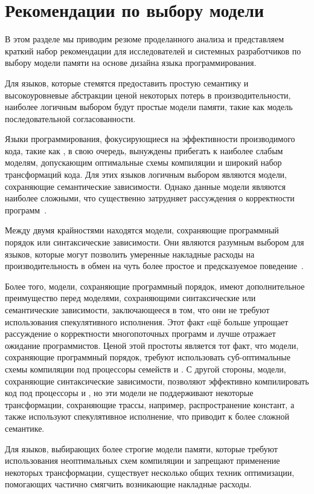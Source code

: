\section{Рекомендации по выбору модели}
\label{sec:discussion}

В этом разделе мы приводим резюме проделанного анализа  
и представляем краткий набор рекомендации для 
исследователей и системных разработчиков 
по выбору модели памяти на основе дизайна языка программирования.

Для языков, которые стемятся предоставить простую семантику 
и высокоуровневые абстракции ценой некоторых потерь в 
производительности, наиболее логичным выбором 
будут простые модели памяти, такие как 
модель последовательной согласованности. 

Языки программирования, фокусирующиеся на 
эффективности производимого кода, 
такие как \CPP, в свою очередь, вынуждены 
прибегать к наиболее слабым моделям, 
допускающим оптимальные схемы компиляции и 
широкий набор трансформаций кода. 
Для этих языков логичным выбором являются 
модели, сохраняющие семантические зависимости. 
Однако данные модели являются наиболее сложными, 
что существенно затрудняет рассуждения о 
корректности программ~\cite{Svendsen-al:ESOP18}. 

Между двумя крайностями находятся модели, 
сохраняющие программный порядок или синтаксические зависимости. 
Они являются разумным выбором для языков, 
которые могут позволить умеренные накладные 
расходы на производительность в обмен 
на чуть более простое и предсказуемое поведение~\cite{Ou-Demsky:OOPSLA18}. 

Более того, модели, сохраняющие программный порядок, 
имеют дополнительное преимущество перед моделями, 
сохраняющими синтаксические или семантические зависимости, 
заключающееся в том, что они не требуют использования 
спекулятивного исполнения. 
Этот факт eщё больше упрощает рассуждение о корректности 
многопоточных программ и лучше отражает ожидание программистов. 
Ценой этой простоты является тот факт, 
что модели, сохраняющие программный порядок, 
требуют использовать суб-оптимальные схемы компиляции 
под процессоры семейств \ARM и \POWER.
С другой стороны, модели, сохраняющие синтаксические зависимости, 
позволяют эффективно компилировать код под процессоры \ARM и \POWER,
но эти модели не поддерживают некоторые трансформации, 
сохраняющие трассы, например, распространение констант, 
а также используют спекулятивное исполнение, 
что приводит к более сложной семантике.  

Для языков, выбирающих более строгие модели памяти, 
которые требуют использования неоптимальных схем компиляции 
и запрещают применение некоторых трансформации, 
существует несколько общих техник оптимизации, 
помогающих частично смягчить возникающие накладные расходы. 

